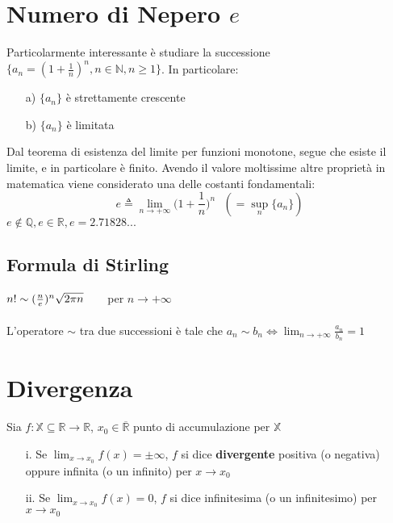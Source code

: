 \section{Numero di Nepero $e$ }
Particolarmente interessante è studiare la successione $\{a_n=(1+ \frac{1}{n})^{n}, n \in \mathbb{N}, n \geq 1\}$. In particolare:
\begin{itemize}
\item[a)] $\{a_n\}$ \`e strettamente crescente
\item[b)] $\{a_n\}$ \`e limitata
\end{itemize}
Dal teorema di esistenza del limite per funzioni monotone, segue che esiste il limite, e in particolare è finito. Avendo il valore moltissime altre proprietà in matematica viene considerato una delle costanti fondamentali:
\begin{equation}
e \triangleq \displaystyle\lim_{n \to +\infty} \biggl(1+\frac{1}{n}\biggl)^n \text{      } (=\displaystyle\sup_{n} \{a_n\})
\end{equation}
$e \not \in \mathbb{Q}, e \in \mathbb{R}, e=2.71828...$
\subsection{Formula di Stirling}
$n! \sim (\frac{n}{e})^{n}\sqrt{2\pi n} \hspace{.6cm}$ per $n \to +\infty$ \\
\\
L'operatore $\sim$ tra due successioni è tale che $a_n \sim b_n \iff \displaystyle\lim_{n \to +\infty} \frac{a_n}{b_n} = 1$

\section{Divergenza}
Sia $f:\mathbb{X} \subseteq \mathbb{R} \to \mathbb{R}$, $x_0 \in \overline{\mathbb{R}}$ punto di accumulazione per $\mathbb{X}$
\begin{enumerate}
\item[i.]Se $\displaystyle\lim_{x \to x_0} f(x)=\pm \infty$, $f$ si dice \textbf{divergente} positiva (o negativa) oppure infinita (o un infinito) per $x \to x_0$
\item[ii.]Se $\displaystyle\lim_{x \to x_0} f(x)=0$, $f$ si dice infinitesima (o un infinitesimo) per $x \to x_0$
\end{enumerate}

